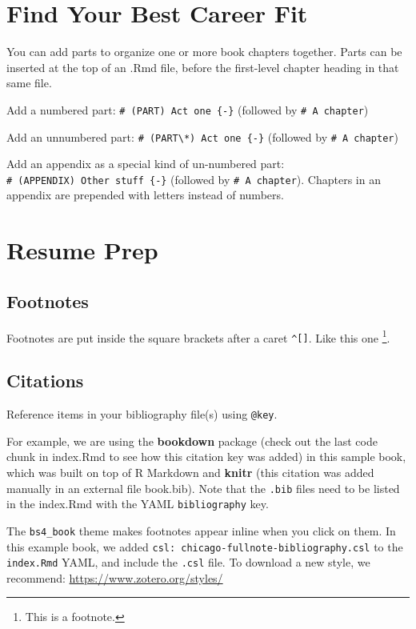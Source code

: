 \documentclass[
]{book}
\theoremstyle{definition}
\theoremstyle{definition}
\theoremstyle{definition}
\theoremstyle{definition}
\theoremstyle{remark}
\begin{document}
\chapter{Find Your Best Career Fit}\label{find-your-best-career-fit}

You can add parts to organize one or more book chapters together. Parts can be inserted at the top of an .Rmd file, before the first-level chapter heading in that same file.

Add a numbered part: \texttt{\#\ (PART)\ Act\ one\ \{-\}} (followed by \texttt{\#\ A\ chapter})

Add an unnumbered part: \texttt{\#\ (PART\textbackslash{}*)\ Act\ one\ \{-\}} (followed by \texttt{\#\ A\ chapter})

Add an appendix as a special kind of un-numbered part: \texttt{\#\ (APPENDIX)\ Other\ stuff\ \{-\}} (followed by \texttt{\#\ A\ chapter}). Chapters in an appendix are prepended with letters instead of numbers.

\chapter{Resume Prep}\label{resume-prep}

\section{Footnotes}\label{footnotes}

Footnotes are put inside the square brackets after a caret \texttt{\^{}{[}{]}}. Like this one \footnote{This is a footnote.}.

\section{Citations}\label{citations}

Reference items in your bibliography file(s) using \texttt{@key}.

For example, we are using the \textbf{bookdown} package \citep{R-bookdown} (check out the last code chunk in index.Rmd to see how this citation key was added) in this sample book, which was built on top of R Markdown and \textbf{knitr} \citep{xie2015} (this citation was added manually in an external file book.bib).
Note that the \texttt{.bib} files need to be listed in the index.Rmd with the YAML \texttt{bibliography} key.

The \texttt{bs4\_book} theme makes footnotes appear inline when you click on them. In this example book, we added \texttt{csl:\ chicago-fullnote-bibliography.csl} to the \texttt{index.Rmd} YAML, and include the \texttt{.csl} file. To download a new style, we recommend: \url{https://www.zotero.org/styles/}
\end{document}
